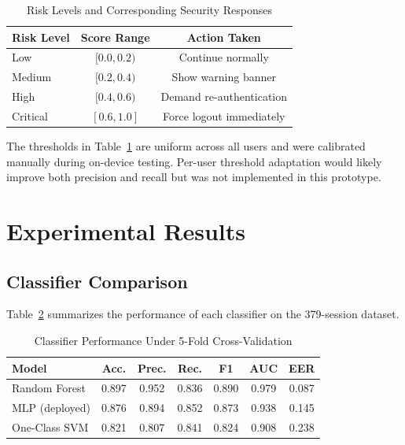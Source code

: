 \documentclass[conference]{IEEEtran}
\begin{document}
\begin{table}[htbp]
\caption{Risk Levels and Corresponding Security Responses}
\label{tab:risk_levels}
\centering
\begin{tabular}{lcc}
\toprule
\textbf{Risk Level} & \textbf{Score Range} & \textbf{Action Taken} \\
\midrule
Low & $[0.0, 0.2)$ & Continue normally \\
Medium & $[0.2, 0.4)$ & Show warning banner \\
High & $[0.4, 0.6)$ & Demand re-authentication \\
Critical & $[0.6, 1.0]$ & Force logout immediately \\
\bottomrule
\end{tabular}
\end{table}

The thresholds in Table~\ref{tab:risk_levels} are uniform across all users and were calibrated manually during on-device testing. Per-user threshold adaptation would likely improve both precision and recall but was not implemented in this prototype.


\section{Experimental Results}
\label{sec:results}

\subsection{Classifier Comparison}

Table~\ref{tab:model_comparison} summarizes the performance of each classifier on the 379-session dataset.

\begin{table}[htbp]
\caption{Classifier Performance Under 5-Fold Cross-Validation}
\label{tab:model_comparison}
\centering
\begin{tabular}{l c c c c c c}
\toprule
\textbf{Model} & \textbf{Acc.} & \textbf{Prec.} & \textbf{Rec.} & \textbf{F1} & \textbf{AUC} & \textbf{EER} \\
\midrule
Random Forest & 0.897 & 0.952 & 0.836 & 0.890 & 0.979 & 0.087 \\
MLP (deployed) & 0.876 & 0.894 & 0.852 & 0.873 & 0.938 & 0.145 \\
One-Class SVM & 0.821 & 0.807 & 0.841 & 0.824 & 0.908 & 0.238 \\
\bottomrule
\end{tabular}
\end{table}
\end{document}
